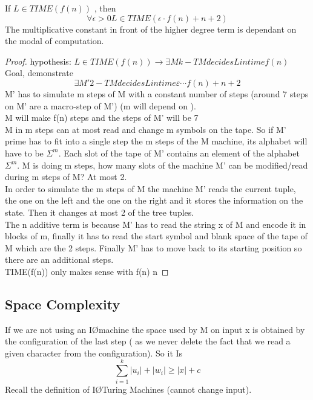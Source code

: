 \begin{theorem}
    If $L \in TIME(f(n))$ , then \[ 
        \forall \epsilon > 0 L \in TIME(\epsilon \cdot f(n)+n +2) 
    \]
    The multiplicative constant in front of the higher degree term is dependant on the modal of computation.
    \begin{proof}
        hypothesis:
        $L \in TIME(f(n)) \rightarrow \exists M k-TM decides L in time f(n) $
        Goal, demonstrate
        \[ 
            \exists M' 2-TM decides L in time \varepsilon\cdots f(n) +n+2 
        \]
        M' has to simulate m steps of M with a constant number of steps (around 7 steps on M' are a macro-step of M') (m will depend on \varepsilon \leadsto {}).\\
        M will make f(n) steps and the steps of M' will be 7 \cdot {}\\
        M in m steps can at most read and change m symbols on the tape. So if M' prime has to fit into a single step the m steps of the M machine, its alphabet will have to be $\Sigma ^m$. Each slot of the tape of M' contains an element of the alphabet $\Sigma^m$. M is doing m steps, how many slots of the machine M' can be modified/read during m steps of M? At most 2.\\
        In order to simulate the m steps of M the machine M' reads the current tuple, the one on the left and the one on the right and it stores the information on the state. Then it changes at most 2 of the tree tuples.\\
        The n additive term is because M' has to read the string x of M and encode it in blocks of m, finally it has to read the start symbol and blank space of the tape of M which are the 2 steps. Finally M' has to move back to its starting position so there are an additional  steps.\\
        TIME(f(n)) only makes sense with f(n) \geq n
    \end{proof}
\end{theorem}

\subsection*{Space Complexity}
 If we are not using an I\O machine the space used by M on input x is obtained by the configuration of the last step ( as we never delete the fact that we read a given character from the configuration). So it Is \[ 
    \sum_{i=1}^{k}{|u_i|+|w_i|} \geq |x| +c
\]
Recall the definition of I\O Turing Machines (cannot change input).